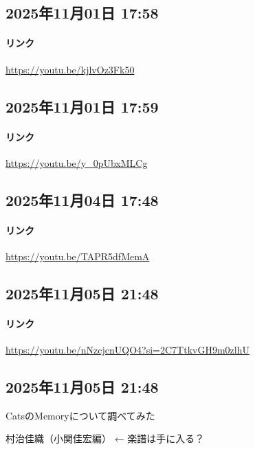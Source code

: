 \subsection*{2025年11月01日 17:58}

\paragraph{リンク}
\url{https://youtu.be/kjlvOz3Fk50}

\subsection*{2025年11月01日 17:59}

\paragraph{リンク}
\url{https://youtu.be/y_0pUbxMLCg}

\subsection*{2025年11月04日 17:48}

\paragraph{リンク}
\url{https://youtu.be/TAPR5dfMemA}

\subsection*{2025年11月05日 21:48}

\paragraph{リンク}
\url{https://youtu.be/nNzcjcnUQO4?si=2C7TtkvGH9m0zlhU}

\subsection*{2025年11月05日 21:48}

CatsのMemoryについて調べてみた

村治佳織（小関佳宏編） ← 楽譜は手に入る？

